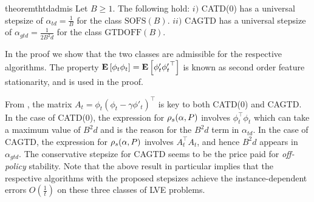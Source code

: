 \fi
\begin{restatable}{theorem}{thtdadmis}\label{th:tdadmis}
Let $B\ge 1$.
The following hold:
$i)$ CATD(0) has a universal stepsize of $\alpha_{td}=\frac{1}{B}$ for  the class $\text{SOFS}(B)$.
$ii)$ CAGTD has a universal stepsize of $\alpha_{gtd}=\frac{1}{2B^2 d}$ for the class $\text{GTDOFF}(B)$.
\end{restatable}
In the proof we show that the two classes are admissible for the respective algorithms.
The property $\mathbf{E}\left[\phi_t\phi_t\right]=\mathbf{E}\left[\phi'_t{\phi'_t}^\top\right]$ is known as second order feature stationarity, and is used in the proof.
\fi

From , the matrix $A_t=\phi_t(\phi_t-\gamma\phi'_t)^\top$ is key to both CATD(0) and CAGTD. In the case of CATD(0),  the expression for $\rho_s(\alpha,P)$ involves $\phi^\top_t\phi_t$ which can take a maximum value of $B^2d$  and is the reason for the $B^2d$ term in $\alpha_{td}$. In the case of CAGTD, the expression for $\rho_s(\alpha,P)$ involves $A_t^\top A_t$, and hence $B^2 d$ appears in $\alpha_{gtd}$. 
The conservative stepsize for CAGTD seems to be the price paid for \emph{off-policy} stability. 
Note that the above result in particular implies that the respective algorithms with the proposed stepsizes achieve the instance-dependent errors $O(\frac{1}{t})$ on these three classes of LVE problems.

